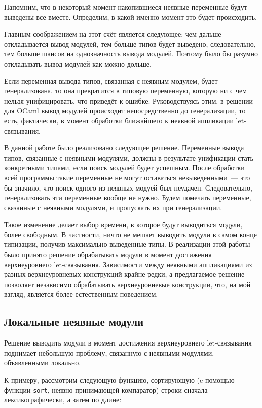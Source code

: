 \documentclass[../diploma.tex]{subfiles}
\begin{document}
Напомним, что в некоторый момент накопившиеся неявные переменные будут выведены все вместе. Определим, в какой именно момент это будет происходить.

Главным соображением на этот счёт является следующее: чем дальше откладывается вывод модулей, тем больше типов будет выведено, следовательно, тем больше шансов на однозначность вывода модулей. Поэтому было бы разумно откладывать вывод модулей как можно дольше.

Если переменная вывода типов, связанная с неявным модулем, будет генерализована, то она превратится в типовую переменную, которую ни с чем нельзя унифицировать, что приведёт к ошибке. Руководствуясь этим, в решении для OCaml вывод модулей происходит непосредственно до генерализации, то есть, фактически, в момент обработки ближайшего к неявной аппликации let-связывания.

В данной работе было реализовано следующее решение. Переменные вывода типов, связанные с неявными модулями, должны в результате унификации стать конкретными типами, если поиск модулей будет успешным. После обработки всей программы такие переменные не могут оставаться невыведенными~--- это бы значило, что поиск одного из неявных модуей был неудачен. Следовательно, генерализовать эти переменные вообще не нужно. Будем помечать переменные, связанные с неявными модулями, и пропускать их при генерализации. 

Такое изменение делает выбор времени, в которое будут выводиться модули, более свободным. В частности, ничто не мешает выводить модули в самом конце типизации, получив максимально выведенные типы. В реализации этой работы было принято решение обрабатывать модули в момент достижения верхнеуровнего let-связывания. Зависимости между неявными аппликациями из разных верхнеуровневых конструкций крайне редки, а предлагаемое решение позволяет независимо обрабатывать верхнеуровневые конструкции, что, на мой взгляд, является более естественным поведением.

\subsection{Локальные неявные модули}

Решение выводить модули в момент достижения верхнеуровнего let-связывания поднимает небольшую проблему, связанную с неявными модулями, объявленными локально.

К примеру, рассмотрим следующую функцию, сортирующую (c помощью функции \texttt{sort}, неявно принимающей компаратор) строки сначала лексикографически, а затем по длине:
\end{document}
